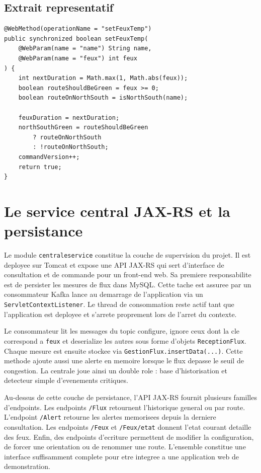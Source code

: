 \documentclass[12pt,a4paper]{report}
\begin{document}
\section*{Extrait representatif}
\begin{verbatim}
@WebMethod(operationName = "setFeuxTemp")
public synchronized boolean setFeuxTemp(
    @WebParam(name = "name") String name,
    @WebParam(name = "feux") int feux
) {
    int nextDuration = Math.max(1, Math.abs(feux));
    boolean routeShouldBeGreen = feux >= 0;
    boolean routeOnNorthSouth = isNorthSouth(name);

    feuxDuration = nextDuration;
    northSouthGreen = routeShouldBeGreen
        ? routeOnNorthSouth
        : !routeOnNorthSouth;
    commandVersion++;
    return true;
}
\end{verbatim}

\chapter{Le service central JAX-RS et la persistance}
Le module \texttt{centraleservice} constitue la couche de supervision du projet. Il est deployee sur Tomcat et expose une API JAX-RS qui sert d'interface de consultation et de commande pour un front-end web. Sa premiere responsabilite est de persister les mesures de flux dans MySQL. Cette tache est assuree par un consommateur Kafka lance au demarrage de l'application via un \texttt{ServletContextListener}. Le thread de consommation reste actif tant que l'application est deployee et s'arrete proprement lors de l'arret du contexte.

Le consommateur lit les messages du topic configure, ignore ceux dont la cle correspond a \texttt{feux} et deserialize les autres sous forme d'objets \texttt{ReceptionFlux}. Chaque mesure est ensuite stockee via \texttt{GestionFlux.insertData(...)}. Cette methode ajoute aussi une alerte en memoire lorsque le flux depasse le seuil de congestion. La centrale joue ainsi un double role : base d'historisation et detecteur simple d'evenements critiques.

Au-dessus de cette couche de persistance, l'API JAX-RS fournit plusieurs familles d'endpoints. Les endpoints \texttt{/Flux} retournent l'historique general ou par route. L'endpoint \texttt{/Alert} retourne les alertes memorisees depuis la derniere consultation. Les endpoints \texttt{/Feux} et \texttt{/Feux/etat} donnent l'etat courant detaille des feux. Enfin, des endpoints d'ecriture permettent de modifier la configuration, de forcer une orientation ou de renommer une route. L'ensemble constitue une interface suffisamment complete pour etre integree a une application web de demonstration.
\end{document}
